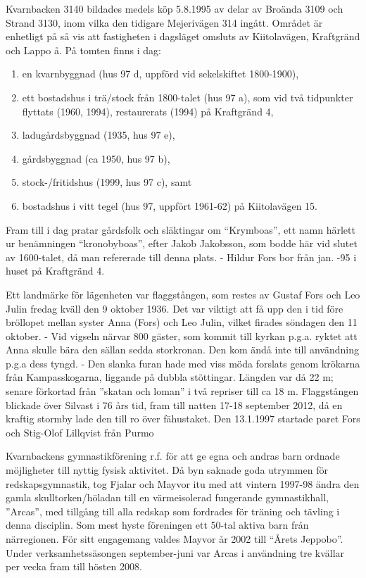 Kvarnbacken 3140 bildades medels köp 5.8.1995 av delar av Broända 3109 och Strand 3130, inom vilka den tidigare Mejerivägen 314 ingått. Området är enhetligt på så vis att fastigheten i dagsläget omsluts av Kiitolavägen, Kraftgränd och Lappo å. På tomten finns i dag:
\begin{enumerate}
  \item en kvarnbyggnad (hus 97 d, uppförd vid sekelskiftet 1800-1900),
  \item ett bostadshus i trä/stock från 1800-talet (hus 97 a), som vid två tidpunkter flyttats (1960, 1994), restaurerats (1994) på Kraftgränd 4,
  \item ladugårdsbyggnad (1935, hus 97 e),
  \item gårdsbyggnad (ca 1950, hus 97 b),
  \item stock-/fritidshus (1999, hus 97 c), samt
  \item bostadshus i vitt tegel (hus 97, uppfört 1961-62) på Kiitolavägen 15.
\end{enumerate}
Fram till i dag pratar gårdsfolk och släktingar om ``Krymboas'', ett namn härlett ur benämningen ``kronobyboas'', efter Jakob Jakobsson, som bodde här vid slutet av 1600-talet, då man refererade till denna plats. - Hildur Fors bor från jan. -95 i huset på Kraftgränd 4.

Ett landmärke för lägenheten var flaggstången, som restes av Gustaf Fors och Leo Julin fredag kväll den 9 oktober 1936. Det var viktigt att få upp den i tid före bröllopet mellan syster Anna (Fors) och Leo Julin, vilket firades söndagen den 11 oktober. - Vid vigseln närvar 800 gäster, som kommit till kyrkan p.g.a. ryktet att Anna skulle bära den sällan sedda storkronan. Den kom ändå inte till användning p.g.a dess tyngd. - Den slanka furan hade med viss möda forslats genom krökarna från Kampasskogarna, liggande på dubbla stöttingar. Längden var då 22 m; senare förkortad från ”skatan och loman” i två repriser till ca 18 m. Flaggstången blickade över Silvast i 76 års tid, fram till natten 17-18 september 2012, då en kraftig stormby lade den till ro över fähustaket. Den 13.1.1997 startade paret Fors och Stig-Olof Lillqvist från Purmo

Kvarnbackens gymnastikförening r.f. för att ge egna och andras barn ordnade möjligheter till nyttig fysisk aktivitet. Då byn saknade goda utrymmen för redskapsgymnastik, tog Fjalar och Mayvor itu med att vintern 1997-98 ändra den gamla skulltorken/höladan till en värmeisolerad fungerande gymnastikhall, ”Arcas”, med tillgång till alla redskap som fordrades för träning och tävling i denna disciplin. Som mest hyste föreningen ett 50-tal aktiva barn från närregionen. För sitt engagemang valdes Mayvor år 2002 till ``Årets Jeppobo''. Under verksamhetssäsongen september-juni var Arcas i användning tre kvällar per vecka fram till hösten 2008.

